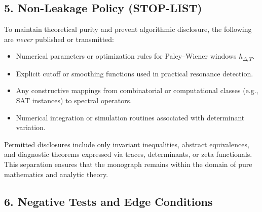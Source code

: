 \subsection*{5. Non-Leakage Policy (STOP-LIST)}\relax\hspace{0pt}
\label{subsec:tfc8-nonleakage}\relax\hspace{0pt}

To maintain theoretical purity and prevent algorithmic disclosure, the following are \emph{never} published or transmitted:
\begin{itemize}
\item Numerical parameters or optimization rules for Paley–Wiener windows $h_{\Delta,T}$.
\item Explicit cutoff or smoothing functions used in practical resonance detection.
\item Any constructive mappings from combinatorial or computational classes (e.g., SAT instances) to spectral operators.
\item Numerical integration or simulation routines associated with determinant variation.
\end{itemize}
Permitted disclosures include only invariant inequalities, abstract equivalences, and diagnostic theorems expressed via traces, determinants, or zeta functionals.  
This separation ensures that the monograph remains within the domain of pure mathematics and analytic theory.\relax\hspace{0pt}

\subsection*{6. Negative Tests and Edge Conditions}\relax\hspace{0pt}
\label{subsec:tfc8-negative}\relax\hspace{0pt}

